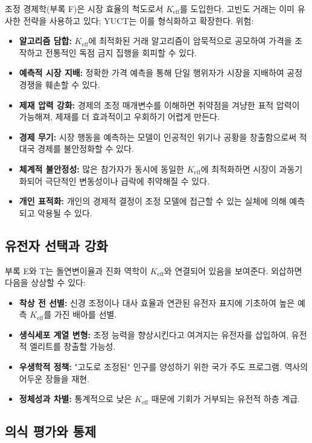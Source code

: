 \documentclass[12pt,a4paper]{article}
\theoremstyle{remark}
\newcommand{\Keff}{K_{\mathrm{eff}}}
\begin{document}
	조정 경제학(부록 F)은 시장 효율의 척도로서 \(\Keff\)를 도입한다. 고빈도 거래는 이미 유사한 전략을 사용하고 있다; YUCT는 이를 형식화하고 확장한다. 위험:
	\begin{itemize}[leftmargin=*]
		\item \textbf{알고리즘 담합:} \(\Keff\)에 최적화된 거래 알고리즘이 암묵적으로 공모하여 가격을 조작하고 전통적인 독점 금지 집행을 회피할 수 있다.
		\item \textbf{예측적 시장 지배:} 정확한 가격 예측을 통해 단일 행위자가 시장을 지배하여 공정 경쟁을 훼손할 수 있다.
		\item \textbf{제재 압력 강화:} 경제의 조정 매개변수를 이해하면 취약점을 겨냥한 표적 압력이 가능해져, 제재를 더 효과적이고 우회하기 어렵게 만든다.
		\item \textbf{경제 무기:} 시장 행동을 예측하는 모델이 인공적인 위기나 공황을 창출함으로써 적대국 경제를 불안정화할 수 있다.
		\item \textbf{체계적 불안정성:} 많은 참가자가 동시에 동일한 \(\Keff\)에 최적화하면 시장이 과동기화되어 극단적인 변동성이나 급락에 취약해질 수 있다.
		\item \textbf{개인 표적화:} 개인의 경제적 결정이 조정 모델에 접근할 수 있는 실체에 의해 예측되고 악용될 수 있다.
	\end{itemize}
	
	\subsection{유전자 선택과 강화}
	\label{subsec:genetic}
	
	부록 E와 T는 돌연변이율과 진화 역학이 \(\Keff\)와 연결되어 있음을 보여준다. 외삽하면 다음을 상상할 수 있다:
	\begin{itemize}[leftmargin=*]
		\item \textbf{착상 전 선별:} 신경 조정이나 대사 효율과 연관된 유전자 표지에 기초하여 높은 예측 \(\Keff\)를 가진 배아를 선별.
		\item \textbf{생식세포 계열 변형:} 조정 능력을 향상시킨다고 여겨지는 유전자를 삽입하여, 유전적 엘리트를 창출할 가능성.
		\item \textbf{우생학적 정책:} "고도로 조정된" 인구를 양성하기 위한 국가 주도 프로그램. 역사의 어두운 장들을 재현.
		\item \textbf{정체성과 차별:} 통계적으로 낮은 \(\Keff\) 때문에 기회가 거부되는 유전적 하층 계급.
	\end{itemize}
	
	\subsection{의식 평가와 통제}
	\label{subsec:consciousness}
	
\end{document}
